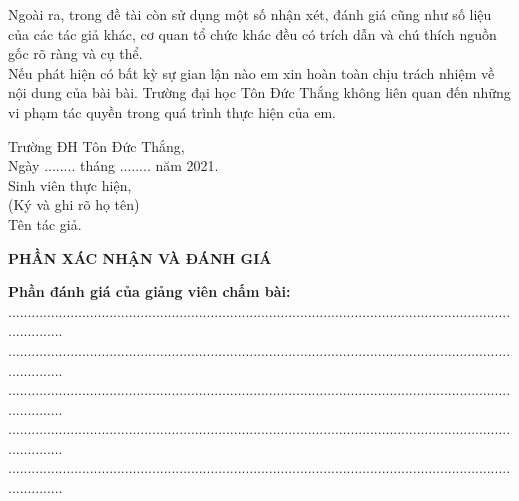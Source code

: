 \documentclass[12pt,a4paper,2sides]{report}
\newcommand{\bai}{bài}
\newcommand{\tacgia}{Tên tác giả} %
\newcommand{\nam}{2021}
\begin{document}
Ngoài ra, trong đề tài còn sử dụng một số nhận xét, đánh giá cũng như số liệu của các tác giả khác, cơ quan tổ chức khác đều có trích dẫn và chú thích nguồn gốc rõ ràng và cụ thể.\\

Nếu phát hiện có bất kỳ sự gian lận nào em xin hoàn toàn chịu trách nhiệm về nội dung của bài \bai. Trường đại học Tôn Đức Thắng không liên quan đến những vi phạm tác quyền trong quá trình thực hiện của em.\\

\begin{center}
	\hspace*{7cm}Trường ĐH Tôn Đức Thắng,\\
	\hspace*{7cm}Ngày ........ tháng ........ năm \nam.\\
	\hspace*{7cm}Sinh viên thực hiện,\\
	\hspace*{7cm}(Ký và ghi rõ họ tên)\\
	\vspace*{0.2cm}
	\vspace*{2cm}
	\hspace*{7cm}\tacgia.
\end{center}		
	\newpage
\begin{center}
	\Large{\textbf{PHẦN XÁC NHẬN VÀ ĐÁNH GIÁ}}
\end{center}
	\textbf{Phần đánh giá của giảng viên chấm bài:}\\
	...............................................................................................................................................\\
	...............................................................................................................................................\\
	...............................................................................................................................................\\
	...............................................................................................................................................\\
	...............................................................................................................................................\\
\end{document}

